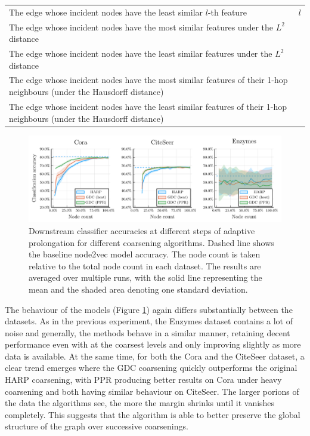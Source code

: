 \begin{table}
\begin{tabularx}{\linewidth}{Xr}
        The edge whose incident nodes have the least similar \( l \)-th feature                                                   & \( l \)                \\
        The edge whose incident nodes have the most similar features under the \( L^2 \) distance                                 &                        \\
        The edge whose incident nodes have the least similar features under the \( L^2 \) distance                             &                        \\
        The edge whose incident nodes have the most similar features of their 1-hop neighbours (under the Hausdorff distance)     &                        \\
        The edge whose incident nodes have the least similar features of their 1-hop neighbours (under the Hausdorff distance) &                        \\
        \bottomrule
    \end{tabularx}
\end{table}

\begin{figure}
  \centering
  \includegraphics[width=\linewidth]{images/coarsening-algorithms/coarsening-algorithms.pdf}
  \caption{Downstream classifier accuracies at different steps of adaptive prolongation for different coarsening algorithms. Dashed line shows the baseline node2vec model accuracy. The node count is taken relative to the total node count in each dataset. The results are averaged over multiple runs, with the solid line representing the mean and the shaded area denoting one standard deviation.}
  \label{fig:coarsening-algorithms}
\end{figure}

The behaviour of the models (Figure \ref{fig:coarsening-algorithms}) again differs substantially between the datasets. As in the previous experiment, the Enzymes dataset contains a lot of noise and generally, the methods behave in a similar manner, retaining decent performance even with at the coarsest levels and only improving slightly as more data is available. At the same time, for both the Cora and the CiteSeer dataset, a clear trend emerges where the GDC coarsening quickly outperforms the original HARP coarsening, with PPR producing better results on Cora under heavy coarsening and both having similar behaviour on CiteSeer. The larger porions of the data the algorithms see, the more the margin shrinks until it vanishes completely. This suggests that the algorithm is able to better preserve the global structure of the graph over successive coarsenings.
